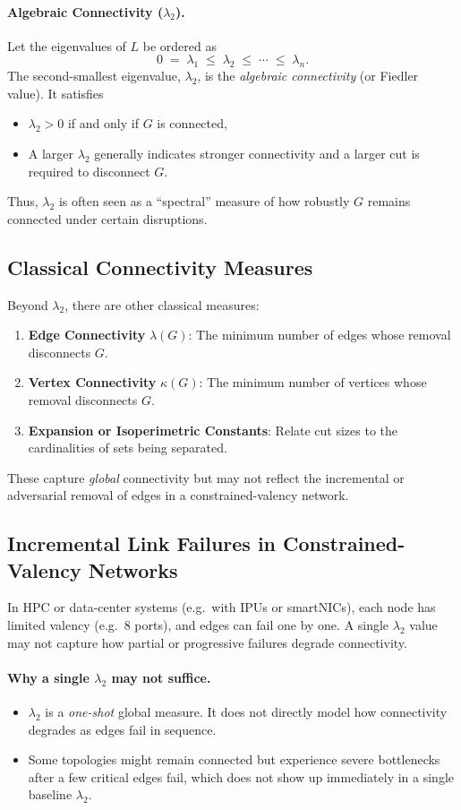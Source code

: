 \documentclass[../../../OAE-SPEC-MAIN.tex]{subfiles}
\begin{document}
\paragraph{Algebraic Connectivity ($\lambda_2$).}
Let the eigenvalues of $L$ be ordered as
\[
  0 \;=\; \lambda_1 \;\le\; \lambda_2 \;\le\; \cdots \;\le\; \lambda_n.
\]
The second-smallest eigenvalue, $\lambda_2$, is the \emph{algebraic connectivity} (or Fiedler value). It satisfies
\begin{itemize}
\item $\lambda_2>0$ if and only if $G$ is connected,
\item A larger $\lambda_2$ generally indicates stronger connectivity and a larger cut is required to disconnect $G$.
\end{itemize}
Thus, $\lambda_2$ is often seen as a ``spectral'' measure of how robustly $G$ remains connected under certain disruptions.

\subsection{Classical Connectivity Measures}

Beyond $\lambda_2$, there are other classical measures:
\begin{enumerate}
\item \textbf{Edge Connectivity} $\lambda(G)$: The minimum number of edges whose removal disconnects $G$.
\item \textbf{Vertex Connectivity} $\kappa(G)$: The minimum number of vertices whose removal disconnects $G$.
\item \textbf{Expansion or Isoperimetric Constants}: Relate cut sizes to the cardinalities of sets being separated.
\end{enumerate}
These capture \emph{global} connectivity but may not reflect the incremental or adversarial removal of edges in a constrained-valency network.

\subsection{Incremental Link Failures in Constrained-Valency Networks}

In HPC or data-center systems (e.g.\ with IPUs or smartNICs), each node has limited valency (e.g.\ 8 ports), and edges can fail one by one. A single $\lambda_2$ value may not capture how partial or progressive failures degrade connectivity.

\paragraph{Why a single $\lambda_2$ may not suffice.}
\begin{itemize}
\item $\lambda_2$ is a \emph{one-shot} global measure. It does not directly model how connectivity degrades as edges fail in sequence.
\item Some topologies might remain connected but experience severe bottlenecks after a few critical edges fail, which does not show up immediately in a single baseline $\lambda_2$.
\end{itemize}
\end{document}
